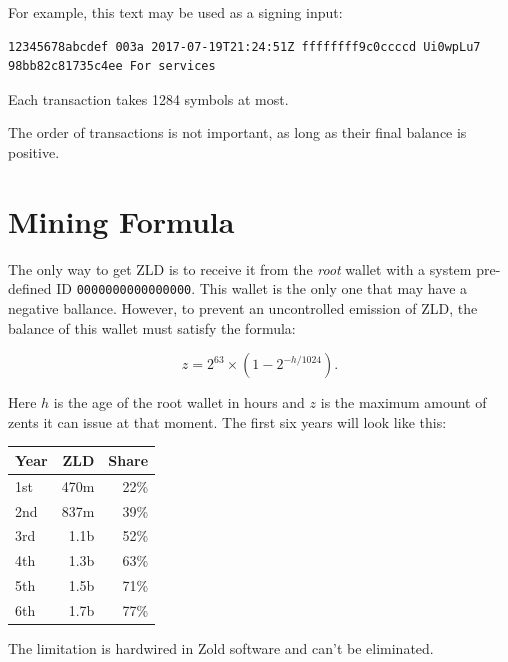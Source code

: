 \documentclass[11pt,oneside]{article}
\newcommand\dd[1]{\colorbox{gray!30}{\texttt{#1}}}
\begin{document}
For example, this text may be used as a signing input:

\begin{verbatim}
12345678abcdef 003a 2017-07-19T21:24:51Z ffffffff9c0ccccd Ui0wpLu7 98bb82c81735c4ee For services
\end{verbatim}

Each transaction takes 1284 symbols at most.

The order of transactions is not important, as long as their final balance is positive.

\section{Mining Formula}

The only way to get ZLD is to receive it from the \emph{root} wallet
with a system pre-defined ID \dd{0000000000000000}.
This wallet is the only one that may have a negative ballance.
However, to prevent an uncontrolled emission of ZLD, the balance
of this wallet must satisfy the formula:

$$z = 2^{63} \times (1 - 2^{-h/1024}).$$

Here $h$ is the age of the root wallet in hours and $z$ is the maximum
amount of zents it can issue at that moment. The first
six years will look like this:

\vspace{\parskip}\begin{center}\begin{tabular}{lrr}
\hline
Year & ZLD & Share \\
\hline
1st & 470m & 22\% \\
2nd & 837m & 39\% \\
3rd & 1.1b & 52\%\\
4th & 1.3b & 63\% \\
5th & 1.5b & 71\% \\
6th & 1.7b & 77\% \\
\hline
\end{tabular}\end{center}

The limitation is hardwired in Zold software and can't be eliminated.

\end{document}
